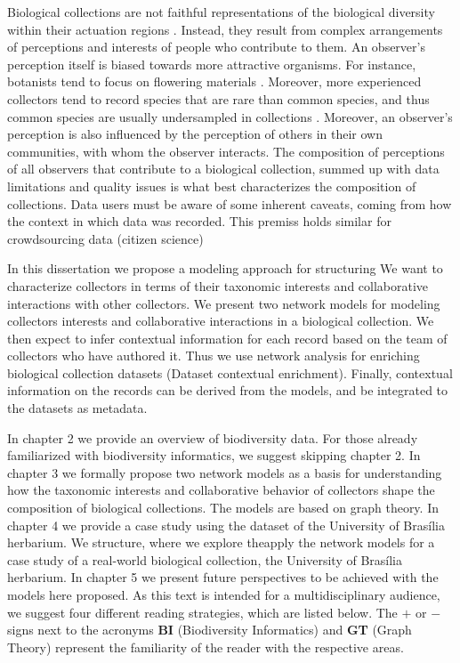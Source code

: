 Biological collections are not faithful representations of the biological diversity within their actuation regions \cite{Funk1999}.
Instead, they result from complex arrangements of perceptions and interests of people who contribute to them.
An observer's perception itself is biased towards more attractive organisms. 
For instance, botanists tend to focus on flowering materials \cite{VanGemerden2005}.
Moreover, more experienced collectors tend to record species that are rare than common species, and thus common species are usually undersampled in collections \cite{Nelson1990}.
Moreover, an observer's perception is also influenced by the perception of others in their own communities, with whom the observer interacts. 
The composition of perceptions of all observers that contribute to a biological collection, summed up with data limitations and quality issues is what best characterizes the composition of collections.
Data users must be aware of some inherent caveats, coming from how the context in which data was recorded. 
This premiss holds similar for crowdsourcing data (citizen science)


In this dissertation we propose a modeling approach for structuring 
We want to characterize collectors in terms of their taxonomic interests and collaborative interactions with other collectors.
We present two network models for modeling collectors interests and collaborative interactions in a biological collection.
We then expect to infer contextual information for each record based on the team of collectors who have authored it.
Thus we use network analysis for enriching biological collection datasets (Dataset contextual enrichment).
Finally, contextual information on the records can be derived from the models, and be integrated to the datasets as metadata. %



In chapter 2 we provide an overview of biodiversity data.
For those already familiarized with biodiversity informatics, we suggest skipping chapter 2.
%
In chapter 3 we formally propose two network models as a basis for understanding how the taxonomic interests and collaborative behavior of collectors shape the composition of biological collections.
The models are based on graph theory.
%
In chapter 4 we provide a case study using the dataset of the University of Brasília herbarium.
We structure, where we explore theapply the network models for a case study of a real-world biological collection, the University of Brasília herbarium.
%
In chapter 5 we present future perspectives to be achieved with the models here proposed.
%
As this text is intended for a multidisciplinary audience, we suggest four different reading strategies, which are listed below.
The $+$ or $-$ signs next to the acronyms \textbf{BI} (Biodiversity Informatics) and \textbf{GT} (Graph Theory) represent the familiarity of the reader with the respective areas.

